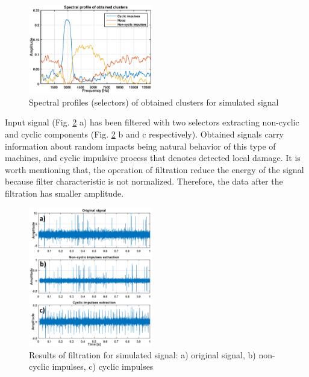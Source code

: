 \documentclass[journal]{IEEEtran}
\begin{document}
\begin{figure}[!ht]
\centering
\includegraphics[width = 0.48\textwidth]{figs3/selector_plot.eps}
\caption{Spectral profiles (selectors) of obtained clusters for simulated signal}
\label{fig: selplots}
\end{figure}

Input signal (Fig. \ref{fig: outplots} a) has been filtered with two selectors extracting non-cyclic and cyclic components (Fig. \ref{fig: outplots} b and c respectively). Obtained signals carry information about random impacts being natural behavior of this type of machines, and cyclic impulsive process that denotes detected local damage. It is worth mentioning that, the operation of filtration reduce the energy of the signal because filter characteristic is not normalized. Therefore, the data after the filtration has smaller amplitude.

\begin{figure}[!ht]
\centering
\includegraphics[width = 0.48\textwidth]{figs3/output_plots.png}
\caption{Results of filtration for simulated signal: a) original signal, b) non-cyclic impulses, c) cyclic impulses}
\label{fig: outplots}
\end{figure}
\end{document}
